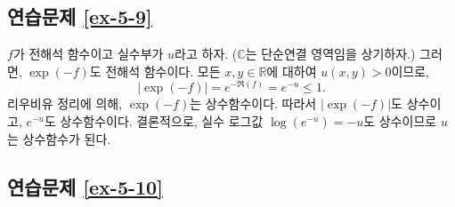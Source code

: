 \subsection*{연습문제 \ref{ex-5-9}}

$f$가 전해석 함수이고 실수부가 $u$라고 하자.
($\mathbb C$는 단순연결 영역임을 상기하자.)
그러면, $\exp(-f)$도 전해석 함수이다.
모든 $x,y \in\mathbb R$에 대하여 $u(x,y) >0$이므로,
\[
|\exp(-f)| = e^{-\Re(f)} = e^{-u} \le 1.
\]
리우비유 정리에 의해, $\exp(-f)$는 상수함수이다.
따라서 $|\exp(-f)|$도 상수이고, $e^{-u}$도 상수함수이다.
결론적으로, 실수 로그값 $\log(e^{-u}) = -u$도 상수이므로
$u$는 상수함수가 된다.

\subsection*{연습문제 \ref{ex-5-10}}

